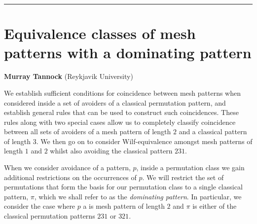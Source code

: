 \documentclass[11pt,a4paper]{article}
\theoremstyle{definition}
\newcommand{\talkTitle}[1]{\hrule\section*{\textsf{\textmd{\LARGE #1}}}}
\newcommand{\talkPresenter}[1]{\textbf{\large #1}}
\newcommand{\talkAffiliation}[1]{(#1)}
\begin{document}
\newcommand{\textpattern}[4][]{%
    \raisebox{0.6ex}{
    \begin{tikzpicture}[scale=\textscale, baseline=(current bounding box.center), #1]
        \shadeboxes{#4}
        \clpattern[8]{#2}{#3}
    \end{tikzpicture}}\;
}

\newcommand{\modpattern}[4][5]{%
    \shadeboxes{#4}
    \clpattern[#1]{#2}{#3}}

    \newcommand{\decompleft}[5]{%
        \begin{tikzpicture}[scale=1.0, baseline=(current bounding box.center)]
            \fill[pattern=north east lines, pattern color=black!75] (0,-1) rectangle +(-0.5,2);
            \foreach \x/\y in {#1}
                \fill[pattern=north east lines, pattern color=black!75] (\x,\y-1) rectangle +(1,1);
            \draw (0,1) -- (0,-1)
                  (-0.5,0) -- (2,0)
                  (1,1) -- (1,-1);
            \filldraw (0,0) circle (3pt);
            \draw (1.5, 0.5) node {\(#5\)};
            \draw (1.5, -0.5) node {\(#3\)};
            \draw (0.5, 0.5) node {\(#4\)};
            \draw (0.5, -0.5) node {\(#2\)};
        \end{tikzpicture}
    }



\talkTitle{Equivalence classes of mesh patterns with a dominating pattern}
\talkPresenter{Murray Tannock}
\talkAffiliation{Reykjavik University}


We establish sufficient conditions for coincidence between mesh patterns when
considered inside a set of avoiders of a classical permutation pattern, and
establish general rules that can be used to construct such coincidences. These
rules along with two special cases allow us to completely classify coincidence
between all sets of avoiders of a mesh pattern of length \(2\) and a classical
pattern of length \(3\). We then go on to consider Wilf-equivalence amongst
mesh patterns of length \(1\) and \(2\) whilst also avoiding the classical pattern
\(231\).

When we consider avoidance of a pattern, \(p\), inside a permutation class we gain
additional restrictions on the occurrences of \(p\).
We will restrict the set of permutations that form the basis
for our permutation class to a single classical pattern, \(\pi\), which we shall
refer to as the \emph{dominating pattern}. In particular, we consider the case
where \(p\) a is mesh pattern of length \(2\) and \(\pi\) is either of the classical
permutation patterns \(231\) or \(321\).
\end{document}
